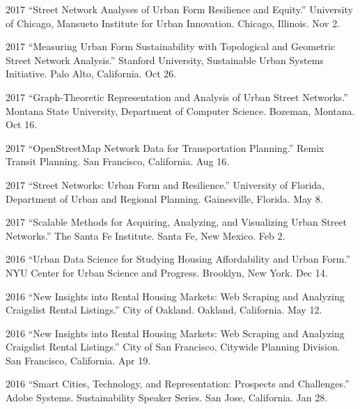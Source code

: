\documentclass[12pt,letterpaper]{report}
\begin{document}
\begin{tablist}
        \item[2017] \tab{}\enquote{Street Network Analyses of Urban Form Resilience and Equity.} University of Chicago, Mansueto Institute for Urban Innovation. Chicago, Illinois. Nov 2.

        \item[2017] \tab{}\enquote{Measuring Urban Form Sustainability with Topological and Geometric Street Network Analysis.} Stanford University, Sustainable Urban Systems Initiative. Palo Alto, California. Oct 26.

        \item[2017] \tab{}\enquote{Graph-Theoretic Representation and Analysis of Urban Street Networks.} Montana State University, Department of Computer Science. Bozeman, Montana. Oct 16.

        \item[2017] \tab{}\enquote{OpenStreetMap Network Data for Transportation Planning.} Remix Transit Planning. San Francisco, California. Aug 16.

        \item[2017] \tab{}\enquote{Street Networks: Urban Form and Resilience.} University of Florida, Department of Urban and Regional Planning. Gainesville, Florida. May 8.

        \item[2017] \tab{}\enquote{Scalable Methods for Acquiring, Analyzing, and Visualizing Urban Street Networks.} The Santa Fe Institute. Santa Fe, New Mexico. Feb 2.

        \item[2016] \tab{}\enquote{Urban Data Science for Studying Housing Affordability and Urban Form.} NYU Center for Urban Science and Progress. Brooklyn, New York. Dec 14.

        \item[2016] \tab{}\enquote{New Insights into Rental Housing Markets: Web Scraping and Analyzing Craigslist Rental Listings.} City of Oakland. Oakland, California. May 12.

        \item[2016] \tab{}\enquote{New Insights into Rental Housing Markets: Web Scraping and Analyzing Craigslist Rental Listings.} City of San Francisco, Citywide Planning Division. San Francisco, California. Apr 19.

        \item[2016] \tab{}\enquote{Smart Cities, Technology, and Representation: Prospects and Challenges.} Adobe Systems. Sustainability Speaker Series. San Jose, California. Jan 28.

    \end{tablist}
\end{document}
